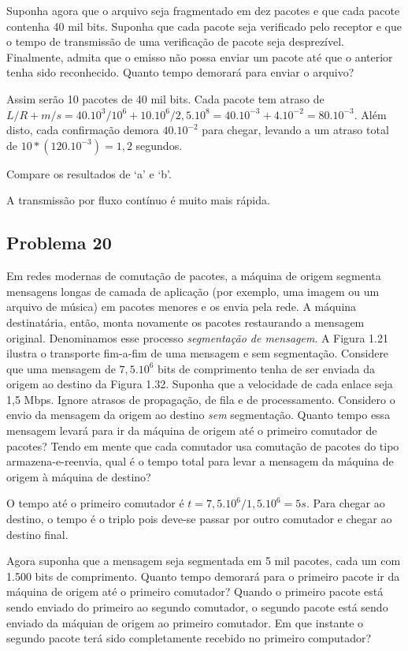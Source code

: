  Suponha agora que o arquivo seja fragmentado em dez pacotes e que cada pacote contenha 40 mil bits. Suponha que cada pacote seja verificado pelo receptor e que o tempo de transmissão de uma verificação de pacote seja desprezível. Finalmente, admita que o emisso não possa enviar um pacote até que o anterior tenha sido reconhecido. Quanto tempo demorará para enviar o arquivo?

Assim serão 10 pacotes de 40 mil bits. Cada pacote tem atraso de $L/R + m/s = 40.10^3/10^6 + 10.10^6/2,5.10^8 = 40.10^{-3} + 4.10^{-2} = 80.10^{-3}$.
Além disto, cada confirmação demora $40.10^{-2}$ para chegar, levando a um atraso total de $10*(120.10^{-3}) = 1,2$ segundos.

 Compare os resultados de `a' e `b'.

A transmissão por fluxo contínuo é muito mais rápida.

\subsection{Problema 20}
Em redes modernas de comutação de pacotes, a máquina de origem segmenta mensagens longas de camada de aplicação (por exemplo, uma imagem ou um arquivo de música) em pacotes menores e os envia pela rede. A máquina destinatária, então, monta novamente os pacotes restaurando a mensagem original. Denominamos esse processo \emph{segmentação de mensagem}. A Figura 1.21 ilustra o transporte fim-a-fim de uma mensagem e sem segmentação. Considere que uma mensagem de $7,5 . 10^6$ bits de comprimento tenha de ser enviada da origem ao destino da Figura 1.32. Suponha que a velocidade de cada enlace seja 1,5 Mbps. Ignore atrasos de propagação, de fila e de processamento.
 Considero o envio da mensagem da origem ao destino \emph{sem} segmentação. Quanto tempo essa mensagem levará para ir da máquina de origem até o primeiro comutador de pacotes? Tendo em mente que cada comutador usa comutação de pacotes do tipo armazena-e-reenvia, qual é o tempo total para levar a mensagem da máquina de origem à máquina de destino?

O tempo até o primeiro comutador é $t = 7,5. 10^6 / 1,5 . 10^6 = 5s$. Para chegar ao destino, o tempo é o triplo pois deve-se passar por outro comutador e chegar ao destino final.

 Agora suponha que a mensagem seja segmentada em 5 mil pacotes, cada um com 1.500 bits de comprimento. Quanto tempo demorará para o primeiro pacote ir da máquina de origem até o primeiro comutador? Quando o primeiro pacote está sendo enviado do primeiro ao segundo comutador, o segundo pacote está sendo enviado da máquian de origem ao primeiro comutador. Em que instante o segundo pacote terá sido completamente recebido no primeiro computador?

